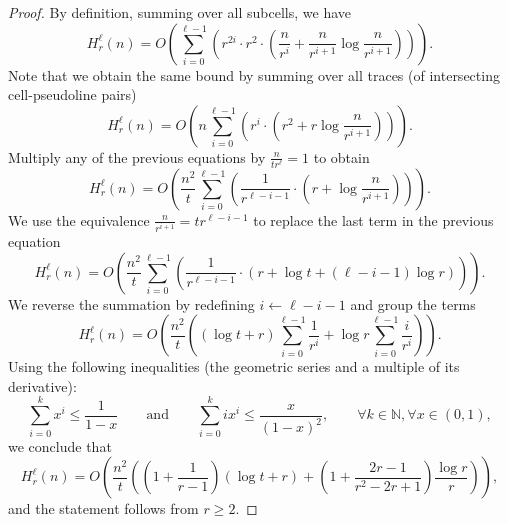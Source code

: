 \begin{proof}
By definition, summing over all subcells, we have
\begin{displaymath} %
H_r^\ell(n)
= O \left(
    \sum_{i=0}^{\ell-1} \left(
	r^{2i} \cdot r^2 \cdot \left(
    \frac{n}{r^i} + \frac{n}{r^{i+1}} \log \frac{n}{r^{i+1}}
    \right)
\right)
\right).
\end{displaymath}
%
Note that we obtain the same bound by
summing over all traces (of intersecting cell-pseudoline pairs)
%
\begin{displaymath}
H_r^\ell(n)
= O \left(
    n
    \sum_{i=0}^{\ell-1} \left(
      r^i \cdot
      \left(
        r^2 + r \log \frac{n}{r^{i+1}}
      \right)
    \right)
\right).
\end{displaymath}
%
Multiply any of the previous equations by \(\frac{n}{tr^\ell} = 1\)
to obtain
%
\begin{displaymath}
H_r^\ell(n)
= O \left(
\frac{n^2}{t}
    \sum_{i=0}^{\ell-1} \left(
      \frac{1}{r^{\ell - i - 1}} \cdot \left(
	r + \log \frac{n}{r^{i+1}}
    \right)
\right)
\right).
\end{displaymath}
%
We use the equivalence \(\frac{n}{r^{i+1}} = t r^{\ell - i - 1}\) to replace
the last term in the previous equation
%
\begin{displaymath}
H_r^\ell(n)
= O \left(
\frac{n^2}{t}
    \sum_{i=0}^{\ell-1} \left(
      \frac{1}{r^{\ell - i - 1}} \cdot \left(
	r + \log t + (\ell - i - 1) \log r
    \right)
\right)
\right).
\end{displaymath}
%
We reverse the summation by redefining \(i \leftarrow \ell - i - 1\) and group the terms
%
\begin{displaymath}
H_r^\ell(n)
=
O \left(
\frac{n^2}{t} \left(
	(\log t + r)  \sum_{i=0}^{\ell-1} \frac{1}{r^{i}}
	+
	\log r \sum_{i=0}^{\ell-1} \frac{i}{r^{i}}
\right)
\right).
\end{displaymath}
%
Using the following inequalities (the geometric series and a multiple of its derivative):
%
\begin{displaymath}
\sum_{i = 0}^{k} x^i
\le
\frac{1}{1-x}
\qquad
\text{and}
\qquad
\sum_{i = 0}^{k} i x^i
\le
\frac{x}{{(1-x)}^2},
\qquad
\forall k \in \mathbb{N},
\forall x \in (0,1),
\end{displaymath}
%
we conclude that
%
\begin{displaymath}
H_r^\ell(n)
=
O\left(
\frac{n^2}{t} \left(
	\left(1 + \frac{1}{r-1} \right) (\log t + r)
	+
	\left(1 + \frac{2r-1}{r^2-2r+1}\right) \frac{\log r}{r}
\right)
\right),
\end{displaymath}
%
and the statement follows from \(r \geq 2\).
\end{proof}

